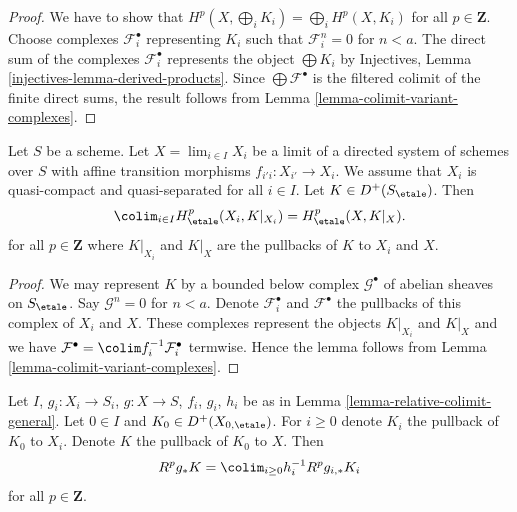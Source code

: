 \begin{proof}
We have to show that $H^p(X, \bigoplus_i K_i) =
\bigoplus_i H^p(X, K_i)$ for all $p \in \mathbf{Z}$.
Choose complexes $\mathcal{F}_i^\bullet$ representing $K_i$
such that $\mathcal{F}_i^n = 0$ for $n < a$.
The direct sum of the complexes $\mathcal{F}_i^\bullet$
represents the object $\bigoplus K_i$ by
Injectives, Lemma \ref{injectives-lemma-derived-products}.
Since $\bigoplus \mathcal{F}^\bullet$ is the filtered
colimit of the finite direct sums, the result follows
from Lemma \ref{lemma-colimit-variant-complexes}.
\end{proof}

\begin{lemma}
\label{lemma-colimit-complexes}
Let $S$ be a scheme. Let $X = \lim_{i \in I} X_i$ be a limit of a
directed system of schemes over $S$ with affine transition morphisms
$f_{i'i} : X_{i'} \to X_i$. We assume that $X_i$ is quasi-compact and
quasi-separated for all $i \in I$. Let $K \in D^+(S_\etale)$. Then
$$
\colim_{i \in I} H_\etale^p(X_i, K|_{X_i}) = H_\etale^p(X, K|_X).
$$
for all $p \in \mathbf{Z}$ where $K|_{X_i}$ and $K|_X$
are the pullbacks of $K$ to $X_i$ and $X$.
\end{lemma}

\begin{proof}
We may represent $K$ by a bounded below complex $\mathcal{G}^\bullet$
of abelian sheaves on $S_\etale$. Say $\mathcal{G}^n = 0$ for $n < a$.
Denote $\mathcal{F}^\bullet_i$ and $\mathcal{F}^\bullet$ the pullbacks
of this complex of $X_i$ and $X$. These complexes represent the
objects $K|_{X_i}$ and $K|_X$ and we have
$\mathcal{F}^\bullet = \colim f_i^{-1}\mathcal{F}_i^\bullet$
termwise. Hence the lemma follows from
Lemma \ref{lemma-colimit-variant-complexes}.
\end{proof}

\begin{lemma}
\label{lemma-relative-colimit-general-complexes}
Let $I$, $g_i : X_i \to S_i$, $g : X \to S$, $f_i$, $g_i$, $h_i$ be as in
Lemma \ref{lemma-relative-colimit-general}.
Let $0 \in I$ and $K_0 \in D^+(X_{0, \etale})$.
For $i \geq 0$ denote $K_i$ the pullback of $K_0$ to $X_i$.
Denote $K$ the pullback of $K_0$ to $X$. Then
$$
R^pg_*K = \colim_{i \geq 0} h_i^{-1}R^pg_{i, *}K_i
$$
for all $p \in \mathbf{Z}$.
\end{lemma}

